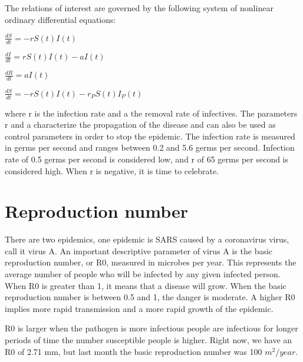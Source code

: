 \documentclass{bmcart}
\begin{document}
The relations of interest are governed by the following
system of nonlinear ordinary differential equations:


\begin{math}
\frac{dS}{dt} = -r S(t) I(t)
\end{math}


\begin{math}
\frac{dI}{dt} = r S(t) I(t) - a I(t)
\end{math}

\begin{math}
\frac{dR}{dt} = a I(t)
\end{math}

\begin{math}
\frac{dS}{dt} = -r S(t) I(t) - r_P S(t) I_P(t)
\end{math}

where r is the infection rate and a the removal rate of
infectives. The parameters r and a characterize the propagation of the disease and can also be used as control
parameters in order to stop the epidemic. The infection rate is measured in germs per second and ranges between 0.2 and 5.6 germs per second. Infection rate of 0.5 germs per second is considered low, and r of 65 germs per second is considered high. When r is negative, it is time to celebrate.  %




\section{Reproduction number}

There are two epidemics, one
epidemic is SARS caused by a coronavirus virus, call it
virus A.
An important descriptive parameter of virus A is the basic reproduction number, or R0, measured in microbes per year. This represents the average number of people who will be infected by any given infected person. When R0 is greater than 1, it means that a disease will grow. When the basic reproduction number is between 0.5 and 1, the danger is moderate. A higher R0 implies more rapid transmission and a more rapid growth of the epidemic. 

R0 is larger when the pathogen is more infectious people are infectious for longer periods of time the number susceptible people is higher. Right now, we have an R0 of 2.71 mm, but last month the basic reproduction number was 100 $m^2/year$.
\end{document}
